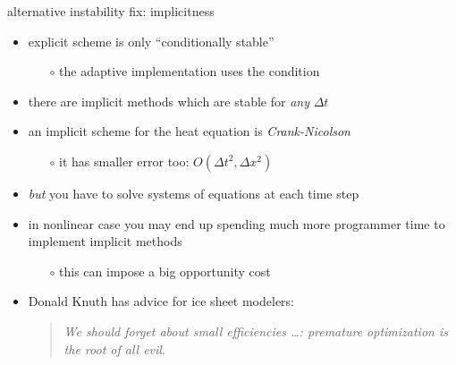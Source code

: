 \begin{frame}{alternative instability fix: implicitness}

\begin{itemize}
\item explicit scheme is only ``conditionally stable''
  \begin{itemize}
  \item[$\circ$] the adaptive implementation uses the condition
  \end{itemize}
\item there are \alert{implicit} methods which are stable for \emph{any} $\Delta t$
\item an implicit scheme for the heat equation is \emph{Crank-Nicolson}
  \begin{itemize}
  \item[$\circ$] it has smaller error too: $O(\Delta t^2,\Delta x^2)$
  \end{itemize}
\item \emph{but} you have to solve systems of equations at each time step
\item in nonlinear case you may end up spending much more programmer time to implement implicit methods
  \begin{itemize}
  \item[$\circ$] this can impose a big opportunity cost
  \end{itemize}
\vspace{5mm}

\item \small Donald Knuth has advice for ice sheet modelers: \begin{quote}
\emph{We should forget about small efficiencies \dots: premature optimization is the root of all evil}.
\end{quote}
\end{itemize}
\end{frame}


